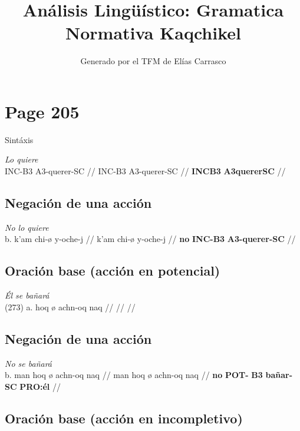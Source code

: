 \documentclass{article}%
\title{Análisis Lingüístico: Gramatica Normativa Kaqchikel}%
\author{Generado por el TFM de Elías Carrasco}%
\begin{document}
%
\normalsize%
\maketitle%
\section{Page 205}%
\label{sec:Page205}%
Sintáxis %
\par\medskip%
\ex
\textit{Lo quiere} \\
\begingl
\gla INC-B3 A3-querer-SC //
\glb INC-B3 A3-querer-SC //
\glc \textbf{INC}\textbf{B3} \textbf{A3}\textbf{querer}\textbf{SC} //
\endgl
\xe
%
\medskip%
\subsection{Negación de una acción}%
\label{subsec:Negacindeunaaccin}%

%
\par\medskip%
\ex
\textit{No lo quiere} \\
\begingl
\gla b. k’am chi-ø y-oche-j //
\glb k’am chi-ø y-oche-j //
\glc \textbf{no} \textbf{INC-}\textbf{B3} \textbf{A3-}\textbf{querer-}\textbf{SC} //
\endgl
\xe
%
\medskip%
\subsection{Oración base (acción en potencial)}%
\label{subsec:Oracinbase(accinenpotencial)}%

%
\par\medskip%
\ex
\textit{Él se bañará} \\
\begingl
\gla (273) a. hoq ø achn-oq naq //
\glb  //
\glc  //
\endgl
\xe
%
\medskip%
\subsection{Negación de una acción}%
\label{subsec:Negacindeunaaccin}%

%
\par\medskip%
\ex
\textit{No se bañará} \\
\begingl
\gla b. man hoq ø achn-oq naq //
\glb man hoq ø achn-oq naq //
\glc \textbf{no} \textbf{POT-} \textbf{B3} \textbf{bañar-}\textbf{SC} \textbf{PRO:él} //
\endgl
\xe
%
\medskip%
\subsection{Oración base (acción en incompletivo)}%
\label{subsec:Oracinbase(accinenincompletivo)}%
\end{document}
